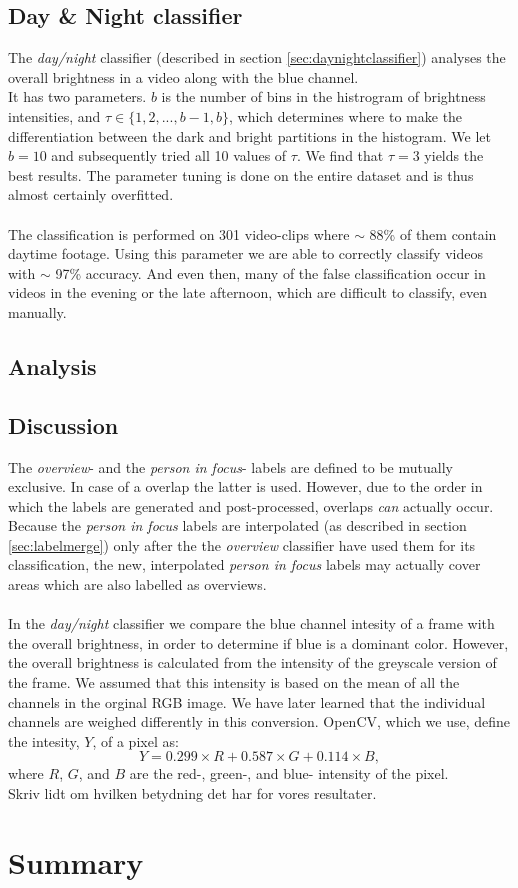 \subsection{Day \& Night classifier}
%
The \textit{day/night} classifier (described in section \ref{sec:daynightclassifier}) analyses the overall brightness in a video along with the blue channel.\\
It has two parameters. $b$ is the number of bins in the histrogram of brightness intensities, and $\tau \in \{1,2,...,b-1,b\}$, which determines where to make the differentiation between the dark and bright partitions in the histogram. We let $b = 10$ and subsequently tried all 10 values of $\tau$. We find that $\tau = 3$ yields the best results. The parameter tuning is done on the entire dataset and is thus almost certainly overfitted.\\
\\
The classification is performed on 301 video-clips where $\sim$ 88\% of them contain daytime footage. Using this parameter we are able to correctly classify videos with $\sim$ 97\% accuracy. And even then, many of the false classification occur in videos in the evening or the late afternoon, which are difficult to classify, even manually.
%
\subsection{Analysis}
%
\subsection{Discussion}\label{sec:phase2discussion}
%
The \textit{overview}- and the \textit{person in focus}- labels are defined to be mutually exclusive. In case of a overlap the latter is used. However, due to the order in which the labels are generated and post-processed, overlaps \textit{can} actually occur. Because the \textit{person in focus} labels are interpolated (as described in section \ref{sec:labelmerge}) only after the the \textit{overview} classifier have used them for its classification, the new, interpolated \textit{person in focus} labels may actually cover areas which are also labelled as overviews.\\
\\
In the \textit{day/night} classifier we compare the blue channel intesity of a frame with the overall brightness, in order to determine if blue is a dominant color. However, the overall brightness is calculated from the intensity of the greyscale version of the frame. We assumed that this intensity is based on the mean of all the channels in the orginal RGB image. We have later learned that the individual channels are weighed differently in this conversion. OpenCV, which we use, define the intesity, $Y$, of a pixel as:
%
\[
Y = 0.299 \times R + 0.587 \times  G + 0.114 \times B,
\]
%
where $R$, $G$, and $B$ are the red-, green-, and blue- intensity of the pixel.\\
Skriv lidt om hvilken betydning det har for vores resultater.
%
\section{Summary}
%